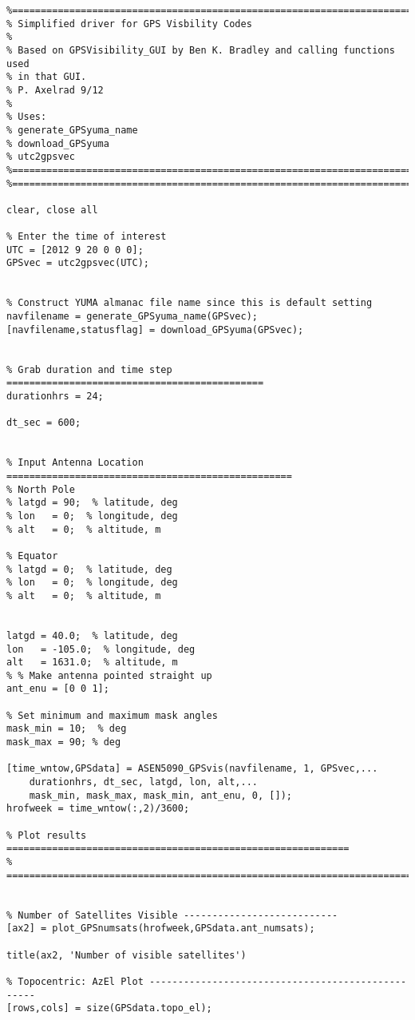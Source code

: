 \documentclass[12pt,a4paper,oneside]{article}
\begin{document}
\newpage


\begin{appendix}
\begin{lstlisting}
%==========================================================================
% Simplified driver for GPS Visbility Codes
%
% Based on GPSVisibility_GUI by Ben K. Bradley and calling functions used
% in that GUI.
% P. Axelrad 9/12
%
% Uses:
% generate_GPSyuma_name
% download_GPSyuma
% utc2gpsvec
%==========================================================================
%==========================================================================

clear, close all

% Enter the time of interest
UTC = [2012 9 20 0 0 0];
GPSvec = utc2gpsvec(UTC);


% Construct YUMA almanac file name since this is default setting
navfilename = generate_GPSyuma_name(GPSvec);
[navfilename,statusflag] = download_GPSyuma(GPSvec);


% Grab duration and time step =============================================
durationhrs = 24;

dt_sec = 600;


% Input Antenna Location ==================================================
% North Pole
% latgd = 90;  % latitude, deg
% lon   = 0;  % longitude, deg
% alt   = 0;  % altitude, m

% Equator
% latgd = 0;  % latitude, deg
% lon   = 0;  % longitude, deg
% alt   = 0;  % altitude, m


latgd = 40.0;  % latitude, deg
lon   = -105.0;  % longitude, deg
alt   = 1631.0;  % altitude, m
% % Make antenna pointed straight up
ant_enu = [0 0 1];

% Set minimum and maximum mask angles
mask_min = 10;  % deg
mask_max = 90; % deg

[time_wntow,GPSdata] = ASEN5090_GPSvis(navfilename, 1, GPSvec,...
    durationhrs, dt_sec, latgd, lon, alt,...
    mask_min, mask_max, mask_min, ant_enu, 0, []);
hrofweek = time_wntow(:,2)/3600;

% Plot results ============================================================
% =========================================================================


% Number of Satellites Visible ---------------------------
[ax2] = plot_GPSnumsats(hrofweek,GPSdata.ant_numsats);

title(ax2, 'Number of visible satellites')

% Topocentric: AzEl Plot --------------------------------------------------
[rows,cols] = size(GPSdata.topo_el);


\end{lstlisting}
\end{appendix}
\end{document}

